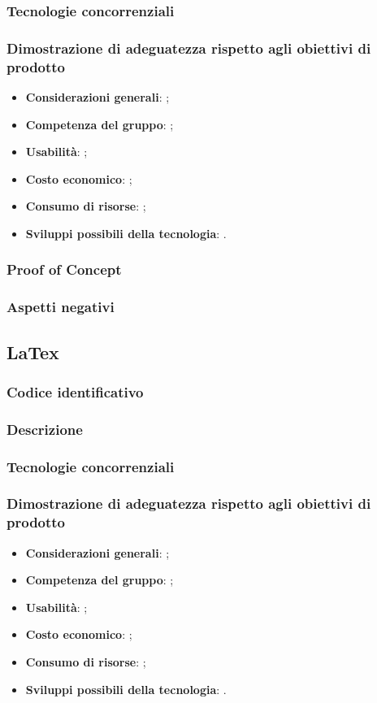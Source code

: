 \documentclass[./../Technology Baseline.tex]{subfiles}
\begin{document}
\subsubsection{Tecnologie concorrenziali}
\subsubsection{Dimostrazione di adeguatezza rispetto agli obiettivi di prodotto}
\begin{itemize}
	\item \textbf{Considerazioni generali}: ;
	\item \textbf{Competenza del gruppo}: ;
	\item \textbf{Usabilità}: ;
	\item \textbf{Costo economico}: ;
	\item \textbf{Consumo di risorse}: ;
	\item \textbf{Sviluppi possibili della tecnologia}: .
\end{itemize}
\subsubsection{Proof of Concept}
\subsubsection{Aspetti negativi}

\subsection{LaTex}

\subsubsection{Codice identificativo}
\subsubsection{Descrizione}
\subsubsection{Tecnologie concorrenziali}
\subsubsection{Dimostrazione di adeguatezza rispetto agli obiettivi di prodotto}
\begin{itemize}
	\item \textbf{Considerazioni generali}: ;
	\item \textbf{Competenza del gruppo}: ;
	\item \textbf{Usabilità}: ;
	\item \textbf{Costo economico}: ;
	\item \textbf{Consumo di risorse}: ;
	\item \textbf{Sviluppi possibili della tecnologia}: .
\end{itemize}
\end{document}
